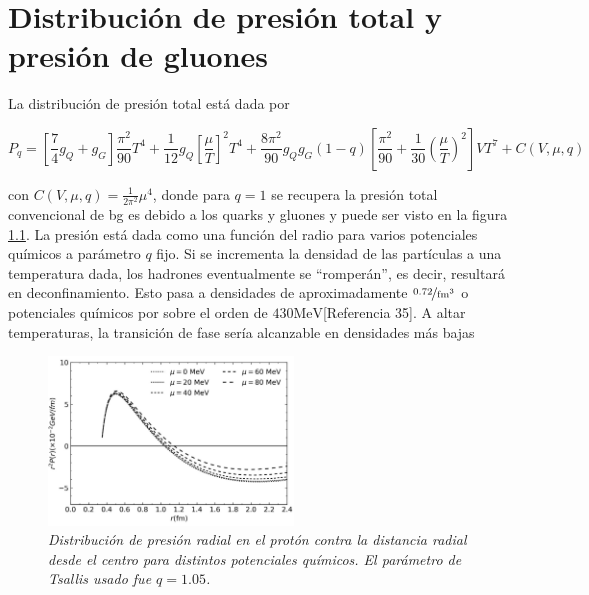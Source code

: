 \chapter{Distribución de presión total y presión de gluones}

La distribución de presión total está dada por 

\begin{equation}
{P}_{q} =\left[\frac{7}{4}{g}_{Q} + {g}_{G} \right] \frac{{\pi}^{2}}{90}{T}^{4} + \frac{1}{12} {g}_{Q} \left[\frac{\mu}{T} \right]^{2} {T}^{4} + \frac{8{\pi}^{2}}{90} {g}_{Q}{g}_{G} \left(1-q\right) \left[\frac{{\pi}^{2}}{90} + \frac{1}{30} \left(\frac{\mu}{T} \right)^{2} \right]V{T}^{7} + C \left(V,\mu,q \right)
\end{equation}

con $C(V,\mu,q) = \frac{1}{2{\pi}^{2}}{\mu}^{4}$, donde para $q=1$ se recupera la presión total convencional de \acrshort{bg} es debido a los quarks y gluones y puede ser visto en la figura \ref{fig: Presión total en T-MIT bag model}. La presión está dada como una función del radio para varios potenciales químicos a parámetro $q$ fijo. Si se incrementa la densidad de las partículas a una temperatura dada, los hadrones eventualmente se ``romperán'', es decir, resultará en deconfinamiento. Esto pasa a densidades de aproximadamente $\nicefrac{0.72}{\mathrm{fm}^{3}}$ o potenciales químicos por sobre el orden de $430 \mathrm{MeV}$[Referencia 35]. A altar temperaturas, la transición de fase sería alcanzable en densidades más bajas

\begin{figure}
\centering
\includegraphics[width=0.58\textwidth]{./Images/TotalPressureTsallis.png}
\caption[Presión total en el modelo T-MIT bag model]{\emph{Distribución de presión radial en el protón  contra la distancia radial desde el centro para distintos potenciales químicos. El parámetro de Tsallis usado fue $q=1.05$.}}
\label{fig: Presión total en T-MIT bag model}
\end{figure}


